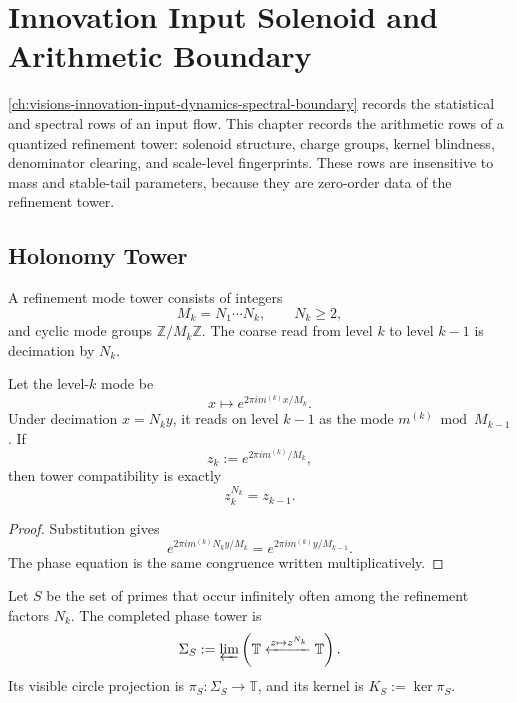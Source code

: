 \chapter{Innovation Input Solenoid and Arithmetic Boundary}
\label{ch:visions-innovation-input-solenoid-arithmetic-boundary}

\autoref{ch:visions-innovation-input-dynamics-spectral-boundary} records
the statistical and spectral rows of an input flow. This chapter records
the arithmetic rows of a quantized refinement tower: solenoid structure,
charge groups, kernel blindness, denominator clearing, and scale-level
fingerprints. These rows are insensitive to mass and stable-tail
parameters, because they are zero-order data of the refinement tower.

\section{Holonomy Tower}
\label{sec:innovation-input-solenoid-holonomy-tower}

\begin{definition}
\label{def:innovation-input-solenoid-refinement-mode-tower}
A refinement mode tower consists of integers
$$
M_k=N_1\cdots N_k,\qquad N_k\ge2,
$$
and cyclic mode groups $\mathbb Z/M_k\mathbb Z$. The coarse read from
level $k$ to level $k-1$ is decimation by $N_k$.
\end{definition}

\begin{lemma}
\label{lem:innovation-input-solenoid-aliasing-equation}
Let the level-$k$ mode be
$$
x\longmapsto e^{2\pi im^{(k)}x/M_k}.
$$
Under decimation $x=N_ky$, it reads on level $k-1$ as the mode
$m^{(k)}\bmod M_{k-1}$. If
$$
z_k:=e^{2\pi im^{(k)}/M_k},
$$
then tower compatibility is exactly
$$
z_k^{N_k}=z_{k-1}.
$$
\end{lemma}

\begin{proof}
Substitution gives
$$
e^{2\pi im^{(k)}N_ky/M_k}
=
e^{2\pi im^{(k)}y/M_{k-1}}.
$$
The phase equation is the same congruence written multiplicatively.
\end{proof}

\begin{definition}
\label{def:innovation-input-solenoid-row}
Let $S$ be the set of primes that occur infinitely often among the
refinement factors $N_k$. The completed phase tower is
$$
\Sigma_S
:=
\varprojlim
\left(
\mathbb T
\xleftarrow{z\mapsto z^{N_k}}
\mathbb T
\right).
$$
Its visible circle projection is $\pi_S:\Sigma_S\to\mathbb T$, and its
kernel is $K_S:=\ker\pi_S$.
\end{definition}

